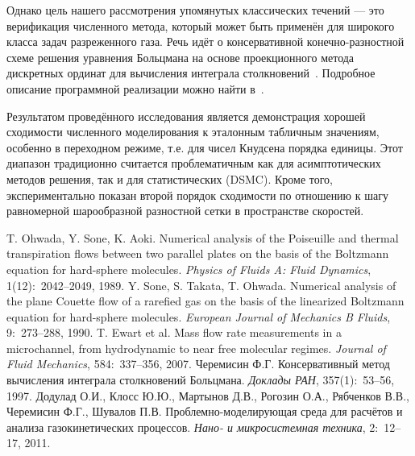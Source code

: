 \documentclass[a4paper,12pt]{article}
\begin{document}
Однако цель нашего рассмотрения упомянутых классических течений --- это верификация численного метода,
который может быть применён для широкого класса задач разреженного газа.
Речь идёт о консервативной конечно-разностной схеме решения уравнения Больцмана
на основе проекционного метода дискретных ординат для вычисления интеграла столкновений~\cite{Tcheremissine1997}.
Подробное описание программной реализации можно найти в~\cite{Our2011}.

Результатом проведённого исследования является демонстрация хорошей сходимости численного моделирования к эталонным табличным значениям,
особенно в переходном режиме, т.е. для чисел Кнудсена порядка единицы. Этот диапазон традиционно считается проблематичным
как для асимптотических методов решения, так и для статистических (DSMC).
Кроме того, экспериментально показан второй порядок сходимости по отношению к шагу равномерной шарообразной разностной сетки в пространстве скоростей.

\begin{thebibliography}{9}
	T. Ohwada, Y. Sone, K. Aoki. Numerical analysis of the Poiseuille and thermal transpiration flows between two parallel plates on the basis of the Boltzmann equation for hard-sphere molecules.
	{\it Physics of Fluids A: Fluid Dynamics},
	1(12):~2042--2049, 1989.
	Y. Sone, S. Takata, T. Ohwada. Numerical analysis of the plane Couette flow of a rarefied gas on
	the basis of the linearized Boltzmann equation for hard-sphere molecules.
	{\it European Journal of Mechanics B Fluids},
	9:~273--288, 1990.
	T. Ewart et al. Mass flow rate measurements in a microchannel, from hydrodynamic
	to near free molecular regimes.
	{\it Journal of Fluid Mechanics},
	584:~337--356, 2007.
	Черемисин Ф.Г. Консервативный метод вычисления интеграла столкновений Больцмана.
	{\it Доклады РАН},
	357(1):~53--56, 1997.
	Додулад О.И., Клосс Ю.Ю., Мартынов Д.В., Рогозин О.А., Рябченков В.В., Черемисин Ф.Г., Шувалов П.В.
	Проблемно-моделирующая среда для расчётов и анализа газокинетических процессов.
	{\it Нано- и микросистемная техника},
	2:~12--17, 2011.

\end{thebibliography}
\end{document}
